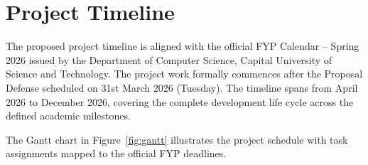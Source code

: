 \documentclass[12pt,a4paper]{report}
\begin{document}
\section{Project Timeline}

The proposed project timeline is aligned with the official FYP Calendar --
Spring 2026 issued by the Department of Computer Science, Capital University of
Science and Technology. The project work formally commences after the Proposal
Defense scheduled on 31st March 2026 (Tuesday). The timeline spans from April
2026 to December 2026, covering the complete development life cycle across the
defined academic milestones.

The Gantt chart in Figure~\ref{fig:gantt} illustrates the project schedule with
task assignments mapped to the official FYP deadlines.

\end{document}
